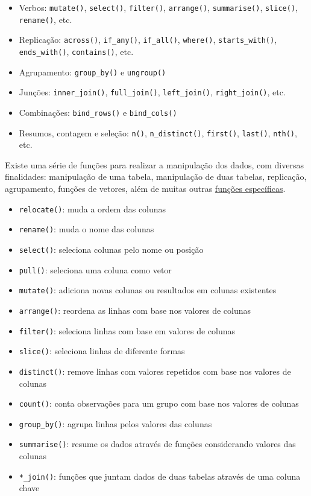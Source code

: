 \documentclass[
]{article}
\providecommand{\tightlist}{%
  \setlength{\itemsep}{0pt}\setlength{\parskip}{0pt}}
\begin{document}
\begin{itemize}
\tightlist
\item
  Verbos: \texttt{mutate()}, \texttt{select()}, \texttt{filter()}, \texttt{arrange()}, \texttt{summarise()}, \texttt{slice()}, \texttt{rename()}, etc.
\item
  Replicação: \texttt{across()}, \texttt{if\_any()}, \texttt{if\_all()}, \texttt{where()}, \texttt{starts\_with()}, \texttt{ends\_with()}, \texttt{contains()}, etc.
\item
  Agrupamento: \texttt{group\_by()} e \texttt{ungroup()}
\item
  Junções: \texttt{inner\_join()}, \texttt{full\_join()}, \texttt{left\_join()}, \texttt{right\_join()}, etc.
\item
  Combinações: \texttt{bind\_rows()} e \texttt{bind\_cols()}
\item
  Resumos, contagem e seleção: \texttt{n()}, \texttt{n\_distinct()}, \texttt{first()}, \texttt{last()}, \texttt{nth()}, etc.
\end{itemize}

Existe uma série de funções para realizar a manipulação dos dados, com diversas finalidades: manipulação de uma tabela, manipulação de duas tabelas, replicação, agrupamento, funções de vetores, além de muitas outras \href{https://dplyr.tidyverse.org/reference/index.html}{funções específicas}.

\begin{itemize}
\tightlist
\item
  \texttt{relocate()}: muda a ordem das colunas
\item
  \texttt{rename()}: muda o nome das colunas
\item
  \texttt{select()}: seleciona colunas pelo nome ou posição
\item
  \texttt{pull()}: seleciona uma coluna como vetor
\item
  \texttt{mutate()}: adiciona novas colunas ou resultados em colunas existentes
\item
  \texttt{arrange()}: reordena as linhas com base nos valores de colunas
\item
  \texttt{filter()}: seleciona linhas com base em valores de colunas
\item
  \texttt{slice()}: seleciona linhas de diferente formas
\item
  \texttt{distinct()}: remove linhas com valores repetidos com base nos valores de colunas
\item
  \texttt{count()}: conta observações para um grupo com base nos valores de colunas
\item
  \texttt{group\_by()}: agrupa linhas pelos valores das colunas
\item
  \texttt{summarise()}: resume os dados através de funções considerando valores das colunas
\item
  \texttt{*\_join()}: funções que juntam dados de duas tabelas através de uma coluna chave
\end{itemize}
\end{document}
